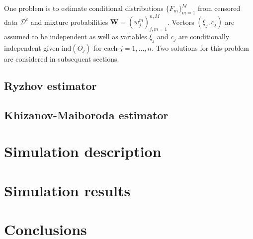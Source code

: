 \documentclass[12pt,reqno,a4paper,oneside,draft]{article}
\theoremstyle{plain}
\theoremstyle{definition}
\theoremstyle{remark}
\begin{document}
One problem is to estimate conditional distributions $\{F_m\}_{m=1}^M$ from censored data $\mathcal D^c$ and mixture probabilities $\mathbf W = (w_j^m)_{j,m=1}^{n,M}$. Vectors $(\xi _j, c _j)$ are assumed to be independent as well as variables $\xi _j$ and $c_j$ are conditionally independent given $\mathrm{ind}(O_j)$ for each $j=1,\ldots ,n$. Two solutions for this problem are considered in subsequent sections.

\subsection{Ryzhov estimator}

\subsection{Khizanov-Maiboroda estimator}


\section{Simulation description}
\label{sec:Simulation_description}

\section{Simulation results}
\label{sec:Simulation_results}

\section{Conclusions}
\label{sec:Conclusions}
\end{document}
